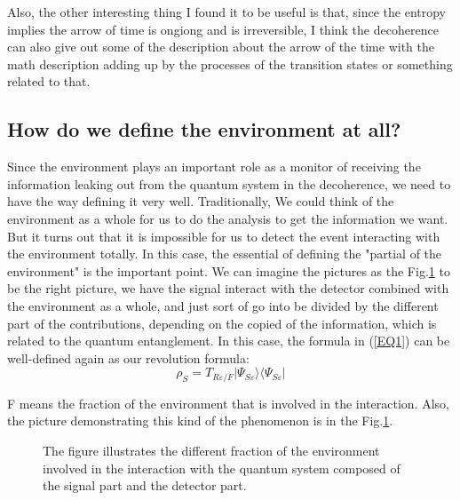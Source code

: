 \documentclass[final,1p,12pt]{elsarticle}
\begin{document}
Also, the other interesting thing I found it to be useful is that, since the entropy implies the arrow of time is ongiong and is irreversible, I think the decoherence can also give out some of the description about the arrow of the time with the math description adding up by the processes of the transition states or something related to that. 

\subsection{How do we define the environment at all?}
Since the environment plays an important role as a monitor of receiving the information leaking out from the quantum system in the decoherence, we need to have the way defining it very well. Traditionally, We could think of the environment as a whole for us to do the analysis to get the information we want. But it turns out that it is impossible for us to detect the event interacting with the environment totally. In this case, the essential of defining the "partial of the environment" is the important point. We can imagine the pictures as the Fig.\ref{111} to be the right picture, we have the signal interact with the detector combined with the environment as a whole, and just sort of go into be divided by the different part of the contributions, depending on the copied of the information, which is related to the quantum entanglement. In this case, the formula in (\ref{EQ1}) can be well-defined again as our revolution formula: \\ 
\begin{equation}
\rho_{S} = T_{R\varepsilon/F} | \Psi_{S\varepsilon} \rangle  \langle \Psi_{S\varepsilon} | 
\end{equation}

F means the fraction of the environment that is involved in the interaction. Also, the picture demonstrating this kind of the phenomenon is in the Fig.\ref{111}.\\
\begin{figure}
\begin{center}
\end{center}
\caption{The figure illustrates the different fraction of the environment involved in the interaction with the quantum system composed of the signal part and the detector part.}
\label{111}
\end{figure}
\end{document}
